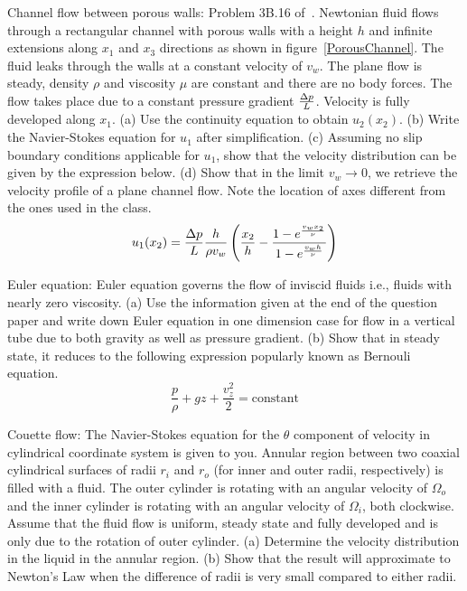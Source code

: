 \begin{question}
Channel flow between porous walls: Problem 3B.16 of~\cite{bls}. Newtonian fluid flows through a rectangular channel with porous walls with a height $h$ and infinite extensions along $x_1$ and $x_3$ directions as shown in figure~\ref{PorousChannel}. The fluid leaks through the walls at a constant velocity of $v_w$. The plane flow is steady, density $\rho$ and viscosity $\mu$ are constant and there are no body forces. The flow takes place due to a constant pressure gradient $\Delta p \over L$. Velocity is fully developed along $x_1$. (a) Use the continuity equation to obtain $u_2(x_2)$. (b) Write the Navier-Stokes equation for $u_1$ after simplification. (c) Assuming no slip boundary conditions applicable for $u_1$, show that the velocity distribution can be given by the expression below.
 (d) Show that in the limit $v_w \rightarrow 0$, we retrieve the velocity profile of a plane channel flow. Note the location of axes different from the ones used in the class.
$$u_1(x_2) = {\Delta p \over L} {h \over \rho v_w} \left( {x_2 \over h} - {{1- e^{v_w x_2 \over \nu}} \over {1 - e^{v_w h \over \nu}}} \right)$$
\end{question}
\begin{solution}[print]
\end{solution}


\begin{question}
Euler equation: Euler equation governs the flow of inviscid fluids i.e., fluids with nearly zero viscosity. (a) Use the information given at the end of the question paper and write down Euler equation in one dimension case for flow in a vertical tube due to both gravity as well as pressure gradient. (b) Show that in steady state, it reduces to the following expression popularly known as Bernouli equation.
$$ \frac{p}{\rho} + gz + \frac{v_z^2}{2} = \text{constant}$$
\end{question}
\begin{solution}[print]
\end{solution}


\begin{question}
Couette flow: The Navier-Stokes equation for the $\theta$ component of velocity in cylindrical coordinate system is given to you. Annular region between two coaxial cylindrical surfaces of radii $r_i$ and $r_o$ (for inner and outer radii, respectively) is filled with a fluid. The outer cylinder is rotating with an angular velocity of $\Omega_o$ and the inner cylinder is rotating with an angular velocity of $\Omega_i$, both clockwise. Assume that the fluid flow is uniform, steady state and fully developed and is only due to the rotation of outer cylinder. (a) Determine the velocity distribution in the liquid in the annular region. (b) Show that the result will approximate to Newton's Law when the difference of radii is very small compared to either radii.
\end{question}
\begin{solution}[print]
\end{solution}

